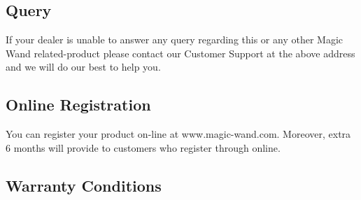 \subsection{Query}
If your dealer is unable to answer any query regarding this or any other Magic Wand related-product please contact our Customer Support at the above address and we will do our best to help you.
\subsection{Online Registration}
You can register your product on-line at www.magic-wand.com. Moreover, extra 6 months will provide to customers who register through online. 

\subsection{Warranty Conditions}
